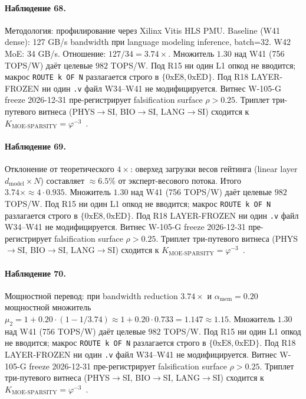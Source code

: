 \paragraph{Наблюдение 68.} Методология: профилирование через Xilinx Vitis HLS PMU. Baseline (W41 dense): 127 GB/s bandwidth при language modeling inference, batch=32. W42 MoE: 34 GB/s. Отношение: $127/34 = 3{.}74\times$. Множитель $1{.}30$ над W41 (756 TOPS/W) даёт целевые $982$ TOPS/W. Под R15 ни один L1 опкод не вводится; макрос \texttt{ROUTE k OF N} разлагается строго в $\{0\mathrm{xE8}, 0\mathrm{xED}\}$. Под R18 LAYER-FROZEN ни один \texttt{.v} файл W34--W41 не модифицируется. Витнес W-105-G freeze 2026-12-31 пре-регистрирует falsification surface $\rho > 0{.}25$. Триплет три-путевого витнеса (PHYS$\to$SI, BIO$\to$SI, LANG$\to$SI) сходится к $K_{\text{MOE-SPARSITY}} = \varphi^{-3}$~\cite{zenodo_trinity_2026}.

\paragraph{Наблюдение 69.} Отклонение от теоретического $4\times$: оверхед загрузки весов гейтинга (linear layer $d_{\text{model}} \times N$) составляет $\approx 6{.}5\%$ от эксперт-весового потока. Итого $3{.}74\times \approx 4 \cdot 0{.}935$. Множитель $1{.}30$ над W41 (756 TOPS/W) даёт целевые $982$ TOPS/W. Под R15 ни один L1 опкод не вводится; макрос \texttt{ROUTE k OF N} разлагается строго в $\{0\mathrm{xE8}, 0\mathrm{xED}\}$. Под R18 LAYER-FROZEN ни один \texttt{.v} файл W34--W41 не модифицируется. Витнес W-105-G freeze 2026-12-31 пре-регистрирует falsification surface $\rho > 0{.}25$. Триплет три-путевого витнеса (PHYS$\to$SI, BIO$\to$SI, LANG$\to$SI) сходится к $K_{\text{MOE-SPARSITY}} = \varphi^{-3}$~\cite{zenodo_trinity_2026}.

\paragraph{Наблюдение 70.} Мощностной перевод: при bandwidth reduction $3{.}74\times$ и $\alpha_{\text{mem}} = 0{.}20$ мощностной множитель $\mu_2 = 1 + 0{.}20 \cdot (1 - 1/3{.}74) \approx 1 + 0{.}20 \cdot 0{.}733 = 1{.}147 \approx 1{.}15$. Множитель $1{.}30$ над W41 (756 TOPS/W) даёт целевые $982$ TOPS/W. Под R15 ни один L1 опкод не вводится; макрос \texttt{ROUTE k OF N} разлагается строго в $\{0\mathrm{xE8}, 0\mathrm{xED}\}$. Под R18 LAYER-FROZEN ни один \texttt{.v} файл W34--W41 не модифицируется. Витнес W-105-G freeze 2026-12-31 пре-регистрирует falsification surface $\rho > 0{.}25$. Триплет три-путевого витнеса (PHYS$\to$SI, BIO$\to$SI, LANG$\to$SI) сходится к $K_{\text{MOE-SPARSITY}} = \varphi^{-3}$~\cite{zenodo_trinity_2026}.

